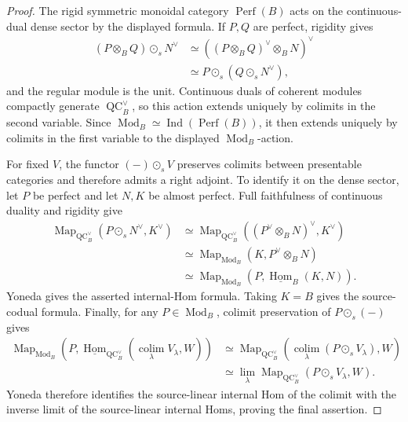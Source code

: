 \begin{proof}
The rigid symmetric monoidal category $\operatorname{Perf}(B)$ acts on the
continuous-dual dense sector by the displayed formula.  If $P,Q$ are perfect,
rigidity gives
\[
\begin{aligned}
(P\otimes_BQ)\odot_sN^\vee
&\simeq
\left((P\otimes_BQ)^\vee\otimes_BN\right)^\vee\\
&\simeq
P\odot_s\left(Q\odot_sN^\vee\right),
\end{aligned}
\]
and the regular module is the unit.  Continuous duals of coherent modules
compactly generate $\operatorname{QC}^{\vee}_B$, so this action extends
uniquely by colimits in the second variable.  Since
$\operatorname{Mod}_B\simeq\operatorname{Ind}(\operatorname{Perf}(B))$, it
then extends uniquely by colimits in the first variable to the displayed
$\operatorname{Mod}_B$-action.

For fixed $V$, the functor $(-)\odot_sV$ preserves colimits between
presentable categories and therefore admits a right adjoint.  To identify it
on the dense sector, let $P$ be perfect and let $N,K$ be almost perfect.  Full
faithfulness of continuous duality and rigidity give
\[
\begin{aligned}
\operatorname{Map}_{\operatorname{QC}^{\vee}_B}
\left(P\odot_sN^\vee,K^\vee\right)
&\simeq
\operatorname{Map}_{\operatorname{QC}^{\vee}_B}
\left((P^\vee\otimes_BN)^\vee,K^\vee\right)\\
&\simeq
\operatorname{Map}_{\operatorname{Mod}_B}
\left(K,P^\vee\otimes_BN\right)\\
&\simeq
\operatorname{Map}_{\operatorname{Mod}_B}
\left(P,\underline{\operatorname{Hom}}_B(K,N)\right).
\end{aligned}
\]
Yoneda gives the asserted internal-Hom formula.  Taking $K=B$ gives the
source-codual formula.  Finally, for any $P\in\operatorname{Mod}_B$,
colimit preservation of $P\odot_s(-)$ gives
\[
\begin{aligned}
\operatorname{Map}_{\operatorname{Mod}_B}
\left(
    P,
    \underline{\operatorname{Hom}}_{\operatorname{QC}^{\vee}_B}
    \left(\operatorname*{colim}_\lambda V_\lambda,W\right)
\right)
&\simeq
\operatorname{Map}_{\operatorname{QC}^{\vee}_B}
\left(
    \operatorname*{colim}_\lambda(P\odot_sV_\lambda),W
\right)\\
&\simeq
\lim_\lambda
\operatorname{Map}_{\operatorname{QC}^{\vee}_B}
\left(P\odot_sV_\lambda,W\right).
\end{aligned}
\]
Yoneda therefore identifies the source-linear internal Hom of the colimit with
the inverse limit of the source-linear internal Homs, proving the final
assertion.
\end{proof}

